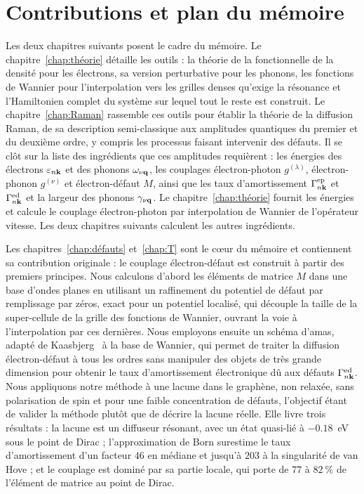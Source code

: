 \section{Contributions et plan du mémoire}
\label{sec:intro-contributions}

Les deux chapitres suivants posent le cadre du mémoire. Le chapitre~\ref{chap:théorie} détaille les outils : la théorie de la fonctionnelle de la densité pour les électrons, sa version perturbative pour les phonons, les fonctions de Wannier pour l'interpolation vers les grilles denses qu'exige la résonance et l'Hamiltonien complet du système sur lequel tout le reste est construit. Le chapitre~\ref{chap:Raman} rassemble ces outils pour établir la théorie de la diffusion Raman, de sa description semi-classique aux amplitudes quantiques du premier et du deuxième ordre, y compris les processus faisant intervenir des défauts. Il se clôt sur la liste des ingrédients que ces amplitudes requièrent : les énergies des électrons $\varepsilon_{n\mathbf{k}}$ et des phonons $\omega_{\nu\mathbf{q}}$, les couplages électron-photon $g^{(\lambda)}$, électron-phonon $g^{(\nu)}$ et électron-défaut $M$, ainsi que les taux d'amortissement $\Gamma^\text{ep}_{n\mathbf{k}}$ et $\Gamma^\text{ed}_{n\mathbf{k}}$ et la largeur des phonons $\gamma_{\nu\mathbf{q}}$. Le chapitre~\ref{chap:théorie} fournit les énergies et calcule le couplage électron-photon par interpolation de Wannier de l'opérateur vitesse. Les deux chapitres suivants calculent les autres ingrédients.

Les chapitres~\ref{chap:défauts} et~\ref{chap:T} sont le c\oe ur du mémoire et contiennent sa contribution originale : le couplage électron-défaut est construit à partir des premiers principes. Nous calculons d'abord les éléments de matrice $M$ dans une base d'ondes planes en utilisant un raffinement du potentiel de défaut par remplissage par zéros, exact pour un potentiel localisé, qui découple la taille de la super-cellule de la grille des fonctions de Wannier, ouvrant la voie à l'interpolation par ces dernières. Nous employons ensuite un schéma d'amas, adapté de Kaasbjerg~\cite{kaasbjergAtomisticMatrixTheory2020} à la base de Wannier, qui permet de traiter la diffusion électron-défaut à tous les ordres sans manipuler des objets de très grande dimension pour obtenir le taux d'amortissement électronique dû aux défauts $\Gamma_{n\mathbf{k}}^\text{ed}$. Nous appliquons notre méthode à une lacune dans le graphène, non relaxée, sans polarisation de spin et pour une faible concentration de défauts, l'objectif étant de valider la méthode plutôt que de décrire la lacune réelle. Elle livre trois résultats : la lacune est un diffuseur résonant, avec un état quasi-lié à $-0.18$~eV sous le point de Dirac ; l'approximation de Born surestime le taux d'amortissement d'un facteur $46$ en médiane et jusqu'à $203$ à la singularité de van Hove ; et le couplage est dominé par sa partie locale, qui porte de $77$ à $82~\%$ de l'élément de matrice au point de Dirac.

